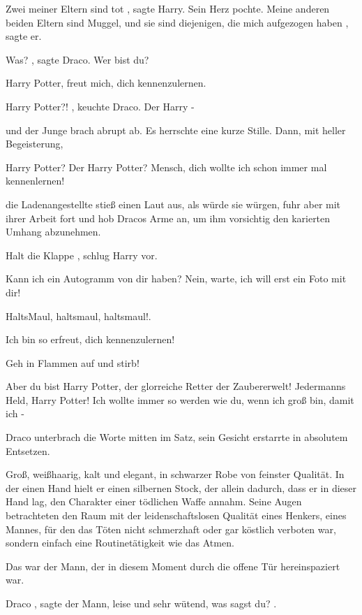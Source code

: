 \glqq Zwei meiner Eltern sind tot\grqq{} ,
sagte Harry. Sein Herz pochte.
\glqq Meine anderen
beiden Eltern sind Muggel, und sie sind diejenigen, die mich aufgezogen haben\grqq{} , sagte er.

\glqq Was?\grqq{} , sagte Draco. \glqq Wer bist du?\grqq{}

\glqq Harry Potter, freut mich, dich
kennenzulernen.\grqq{}

\glqq Harry Potter?!\grqq{} , keuchte Draco. \glqq Der Harry -\grqq{}

und der
Junge brach abrupt ab. Es herrschte eine kurze Stille. Dann, mit heller Begeisterung,

\glqq Harry Potter?
Der Harry Potter? Mensch, dich wollte ich schon immer mal kennenlernen!\grqq{}

die Ladenangestellte stieß
einen Laut aus, als würde sie würgen, fuhr aber mit ihrer Arbeit fort und hob Dracos Arme an, um ihm vorsichtig den
karierten Umhang abzunehmen.

\glqq Halt die Klappe\grqq{} , schlug Harry vor.

\glqq Kann ich ein
Autogramm von dir haben? Nein, warte, ich will erst ein Foto mit dir!\grqq{}

\glqq HaltsMaul, haltsmaul,
haltsmaul!.\grqq{}

\glqq Ich bin so erfreut, dich kennenzulernen!\grqq{}

\glqq Geh in Flammen auf
und stirb!\grqq{}

\glqq Aber du bist Harry Potter, der glorreiche Retter der Zaubererwelt! Jedermanns Held,
Harry Potter! Ich wollte immer so werden wie du, wenn ich groß bin, damit ich -\grqq{}

Draco unterbrach die
Worte mitten im Satz, sein Gesicht erstarrte in absolutem Entsetzen.

Groß, weißhaarig, kalt und elegant, in
schwarzer Robe von feinster Qualität. In der einen Hand hielt er einen silbernen Stock, der allein dadurch, dass er in
dieser Hand lag, den Charakter einer tödlichen Waffe annahm. Seine Augen betrachteten den Raum mit der
leidenschaftslosen Qualität eines Henkers, eines Mannes, für den das Töten nicht schmerzhaft oder gar köstlich verboten
war, sondern einfach eine Routinetätigkeit wie das Atmen.

Das war der Mann, der in diesem Moment durch die
offene Tür hereinspaziert war.

\glqq Draco\grqq{} , sagte der Mann, leise und sehr wütend, \glqq was sagst
du?\grqq{} .

